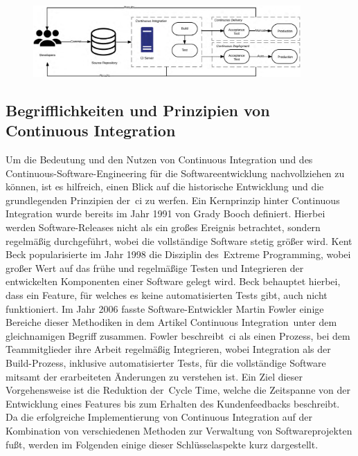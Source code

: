 \begin{figure}[H]
    \centering
    \includegraphics[width=0.91\textwidth]{images/content/ci-cde-cd}
    \label{fig:ci-cde-cd}
\end{figure}

\subsection{Begrifflichkeiten und Prinzipien von Continuous Integration} \label{subsec:02-background-2}

Um die Bedeutung und den Nutzen von Continuous Integration und des Continuous-Software-Engineering für die
Softwareentwicklung nachvollziehen zu können, ist es hilfreich, einen Blick auf die historische Entwicklung und die
grundlegenden Prinzipien der\ \acrshort{ci} zu werfen.
Ein Kernprinzip hinter Continuous Integration wurde bereits im Jahr 1991 von Grady Booch definiert.
Hierbei werden Software-Releases nicht als ein großes Ereignis betrachtet, sondern regelmäßig durchgeführt, wobei
die vollständige Software stetig größer wird.
Kent Beck popularisierte im Jahr 1998 die Disziplin des\ \glqq Extreme Programming\grqq, wobei großer Wert auf das frühe
und regelmäßige Testen und Integrieren der entwickelten Komponenten einer Software gelegt wird.
Beck behauptet hierbei, dass ein Feature, für welches es keine automatisierten Tests gibt, auch nicht funktioniert.
Im Jahr 2006 fasste Software-Entwickler Martin Fowler einige Bereiche dieser Methodiken in dem Artikel
\glqq Continuous Integration\grqq\ unter dem gleichnamigen Begriff zusammen.
Fowler beschreibt\ \acrshort{ci} als einen Prozess, bei dem Teammitglieder ihre Arbeit regelmäßig Integrieren,
wobei Integration als der Build-Prozess, inklusive automatisierter Tests, für die vollständige Software mitsamt der
erarbeiteten Änderungen zu verstehen ist.
Ein Ziel dieser Vorgehensweise ist die Reduktion der\ \glqq Cycle Time\grqq, welche die Zeitspanne von der Entwicklung
eines Features bis zum Erhalten des Kundenfeedbacks beschreibt.
Da die erfolgreiche Implementierung von Continuous Integration auf der Kombination von verschiedenen Methoden zur
Verwaltung von Softwareprojekten fußt, werden im Folgenden einige dieser Schlüsselaspekte kurz dargestellt.


